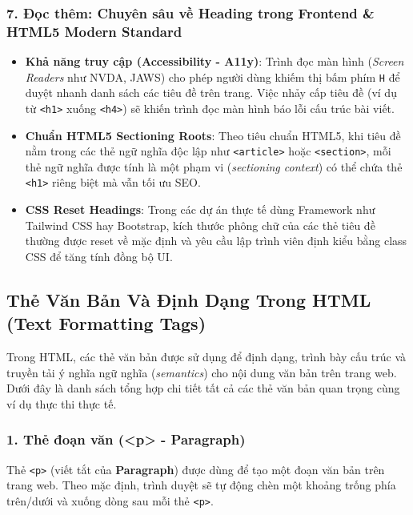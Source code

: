 \documentclass[11pt,oneside]{book}
\newcommand{\codeinline}[1]{\textcolor{accentOrange}{\texttt{#1}}}
\begin{document}
\subsubsection{7. Đọc thêm: Chuyên sâu về Heading trong Frontend \& HTML5 Modern Standard}

\begin{conceptBox}
\begin{itemize}[leftmargin=1.5em, itemsep=3pt, parsep=0pt]
    \item \textbf{Khả năng truy cập (Accessibility - A11y)}: Trình đọc màn hình (\textit{Screen Readers} như NVDA, JAWS) cho phép người dùng khiếm thị bấm phím \codeinline{H} để duyệt nhanh danh sách các tiêu đề trên trang. Việc nhảy cấp tiêu đề (ví dụ từ \codeinline{<h1>} xuống \codeinline{<h4>}) sẽ khiến trình đọc màn hình báo lỗi cấu trúc bài viết.
    \item \textbf{Chuẩn HTML5 Sectioning Roots}: Theo tiêu chuẩn HTML5, khi tiêu đề nằm trong các thẻ ngữ nghĩa độc lập như \codeinline{<article>} hoặc \codeinline{<section>}, mỗi thẻ ngữ nghĩa được tính là một phạm vi (\textit{sectioning context}) có thể chứa thẻ \codeinline{<h1>} riêng biệt mà vẫn tối ưu SEO.
    \item \textbf{CSS Reset Headings}: Trong các dự án thực tế dùng Framework như Tailwind CSS hay Bootstrap, kích thước phông chữ của các thẻ tiêu đề thường được reset về mặc định và yêu cầu lập trình viên định kiểu bằng class CSS để tăng tính đồng bộ UI.
\end{itemize}
\end{conceptBox}

\subsection{Thẻ Văn Bản Và Định Dạng Trong HTML (Text Formatting Tags)}
\label{subsec:text_formatting_tags}

Trong HTML, các thẻ văn bản được sử dụng để định dạng, trình bày cấu trúc và truyền tải ý nghĩa ngữ nghĩa (\textit{semantics}) cho nội dung văn bản trên trang web. Dưới đây là danh sách tổng hợp chi tiết tất cả các thẻ văn bản quan trọng cùng ví dụ thực thi thực tế.

\subsubsection{1. Thẻ đoạn văn (<p> - Paragraph)}

Thẻ \codeinline{<p>} (viết tắt của \textbf{Paragraph}) được dùng để tạo một đoạn văn bản trên trang web. Theo mặc định, trình duyệt sẽ tự động chèn một khoảng trống phía trên/dưới và xuống dòng sau mỗi thẻ \codeinline{<p>}.
\end{document}

